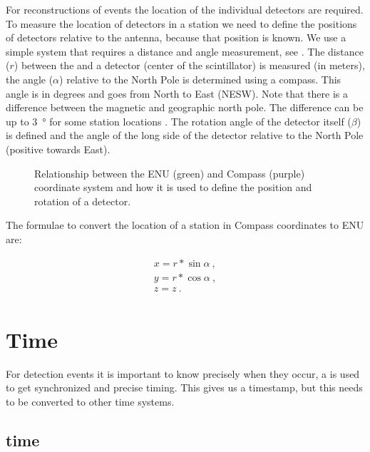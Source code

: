 For reconstructions of events the location of the individual detectors
are required. To measure the location of detectors in a station we need
to define the positions of detectors relative to the \gps antenna,
because that position is known. We use a simple system that requires a
distance and angle measurement, see . The
distance ($r$) between the \gps and a detector (center of the
scintillator) is measured (in meters), the angle ($\alpha$) relative to
the North Pole is determined using a compass. This angle is in degrees
and goes from North to East (NESW). Note that there is a difference
between the magnetic and geographic north pole. The difference can be up
to \SI{3}{\degree} for some \hisparc station locations
\cite{canada:2013aa}. The rotation angle of the detector itself
($\beta$) is defined and the angle of the long side of the detector
relative to the North Pole (positive towards East).

\begin{figure}
    \centering
    
    \caption{Relationship between the ENU (green) and Compass (purple)
             coordinate system and how it is used to define the position
             and rotation of a detector.}
    \label{fig:enu_compass}
\end{figure}

The formulae to convert the location of a station in Compass coordinates
to ENU are:

\begin{equation}
    \begin{array}{l}
        x = r * \sin{\alpha} \ , \\
        y = r * \cos{\alpha} \ , \\
        z = z \ . \\
    \end{array}
\end{equation}


\section{Time}

For \hisparc detection events it is important to know precisely when
they occur, a \gps is used to get synchronized and precise timing. This
gives us a timestamp, but this needs to be converted to other time
systems.


\subsection{\gps time}

